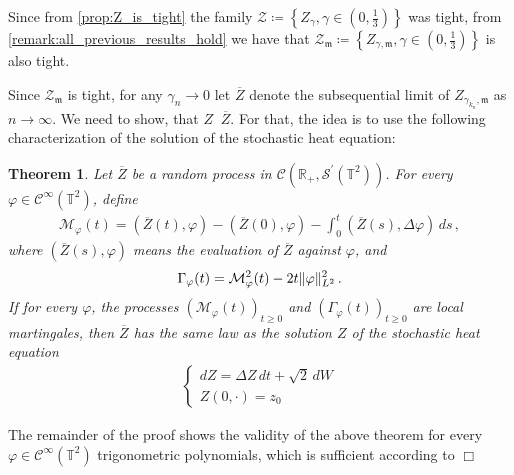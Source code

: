 \documentclass{report}
\newcommand{\RR}{\mathbb{R}}
\newcommand{\TT}{\mathbb{T}}
\DeclarePairedDelimiter\norm{\lVert}{\rVert}%
\DeclareMathOperator{\DEquiv}{\stackrel{(d)}{=}}
\DeclareMathOperator{\DefiningEquality}{\coloneqq}
\newtheorem{theorem}{Theorem}[chapter]
\renewenvironment{proof}{{\bf \emph{Proof (idea):} }}{\hfill $\Box$ \\}
\theoremstyle{remark}
\theoremstyle{definition}
\let\phi\varphi
\begin{document}
\begin{proof}
  Since from \autoref{prop:Z_is_tight} the family $\mathcal{Z} \DefiningEquality \left\{Z_\gamma, \gamma \in (0, \frac{1}{3})\right\}$ was tight, from \autoref{remark:all_previous_results_hold} we have that $\mathcal{Z}_\mathfrak{m} \DefiningEquality \left\{Z_{\gamma, \mathfrak{m}}, \gamma \in (0, \frac{1}{3})\right\}$ is also tight.

  Since $\mathcal{Z}_\mathfrak{m}$ is tight, for any $\gamma_n \to 0$ let $\overline{Z}$ denote the subsequential limit of $Z_{\gamma_{k_n}, \mathfrak{m}}$ as $n \to \infty$. We need to show, that $Z \DEquiv \overline{Z}$. For that, the idea is to use the following characterization of the solution of the stochastic heat equation:

  \begin{theorem}
    Let $\overline{Z}$ be a random process in $\mathcal{C}(\RR_+, \mathcal{S}^\prime(\TT^2))$. For every $\phi \in \mathcal{C}^\infty(\TT^2)$, define
    \begin{align*}
      \mathcal{M}_\phi(t) = (\overline{Z}(t), \phi) - (\overline{Z}(0), \phi) - \int_0^t(\overline{Z}(s), \Delta \phi)\,ds\,,
    \end{align*}
    where $(\overline{Z}(s), \phi)$ means the evaluation of $\overline{Z}$ against $\phi$, and
    \begin{align*}
      \Gamma_\phi(t) = \mathcal{M}_\phi^2(t) - 2 t \norm{\phi}^2_{L^2}\,.
    \end{align*}
    If for every $\phi$, the processes $(\mathcal{M}_\phi(t))_{t \ge 0}$ and $(\Gamma_\phi(t))_{t \ge 0}$ are local martingales, then $\overline{Z}$ has the same law as the solution $Z$ of the stochastic heat equation
    \begin{align*}
      \begin{cases}
        dZ = \Delta Z\,dt + \sqrt{2}\,dW\\
        Z(0, \cdot) = z_0
      \end{cases}
    \end{align*}
  \end{theorem}
  The remainder of the proof shows the validity of the above theorem for every $\phi \in \mathcal{C}^\infty(\TT^2)$ trigonometric polynomials, which is sufficient according to \cite[Remark C.4]{mourrat2015convergencetwodimensionaldynamicisingkac}
\end{proof}
\end{document}
